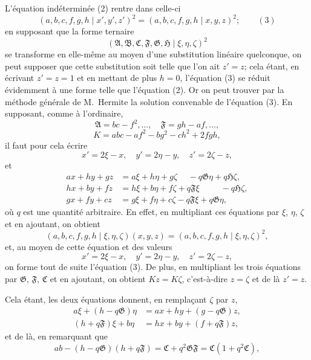 \documentclass[11pt]{article}
\begin{document}
\medskip
L'\'equation ind\'etermin\'ee (2) rentre dans celle-ci
\[
(a,b,c,f,g,h\mid x',y',z')^{2}=(a,b,c,f,g,h\mid x,y,z)^{2};\qquad(3)
\]
en supposant que la forme ternaire
\[
(\mathfrak{A},\mathfrak{B},\mathfrak{C},\mathfrak{F},\mathfrak{G},\mathfrak{H}\mid \xi,\eta,\zeta)^{2}
\]
se transforme en elle-m\^eme au moyen d'une substitution lin\'eaire quelconque, on peut supposer que cette substitution soit telle que l'on ait $z'=z$; cela \'etant, en \'ecrivant $z'=z=1$ et en mettant de plus $h=0$, l'\'equation (3) se r\'eduit \'evidemment \`a une forme telle que l'\'equation (2). Or on peut trouver par la m\'ethode g\'en\'erale de M.\ Hermite la solution convenable de l'\'equation (3). En supposant, comme \`a l'ordinaire,
\[
\mathfrak{A}=bc-f^{2},\ldots,\quad \mathfrak{F}=gh-af,\ldots,
\]
\[
K=abc-af^{2}-bg^{2}-ch^{2}+2fgh,
\]
il faut pour cela \'ecrire
\[
x'=2\xi-x,\quad y'=2\eta-y,\quad z'=2\zeta-z,
\]
et
\[
\begin{aligned}
ax+hy+gz &= a\xi+h\eta+g\zeta\phantom{+\eta} -q\mathfrak{G}\eta + q\mathfrak{H}\zeta,\\
hx+by+fz &= h\xi+b\eta+f\zeta + q\mathfrak{F}\xi\phantom{+\eta-} -q\mathfrak{H}\zeta,\\
gx+fy+cz &= g\xi+f\eta+c\zeta - q\mathfrak{F}\xi + q\mathfrak{G}\eta,
\end{aligned}
\]
o\`u $q$ est une quantit\'e arbitraire. En effet, en multipliant ces \'equations par $\xi$, $\eta$, $\zeta$ et en ajoutant, on obtient
\[
(a,b,c,f,g,h\mid \xi,\eta,\zeta)(x,y,z)=(a,b,c,f,g,h\mid \xi,\eta,\zeta)^{2},
\]
et, au moyen de cette \'equation et des valeurs
\[
x'=2\xi-x,\quad y'=2\eta-y,\quad z'=2\zeta-z,
\]
on forme tout de suite l'\'equation (3). De plus, en multipliant les trois \'equations par $\mathfrak{G}$, $\mathfrak{F}$, $\mathfrak{C}$ et en ajoutant, on obtient $Kz=K\zeta$, c'est-\`a-dire $z=\zeta$ et de l\`a $z'=z$.

\medskip
Cela \'etant, les deux \'equations donnent, en rempla\c{c}ant $\zeta$ par $z$,
\[
\begin{aligned}
a\xi + (h - q\mathfrak{G})\eta &= ax + hy + (g - q\mathfrak{G})z,\\
(h + q\mathfrak{F})\xi + b\eta &= hx + by + (f + q\mathfrak{F})z,
\end{aligned}
\]
et de l\`a, en remarquant que
\[
ab-(h-q\mathfrak{G})(h+q\mathfrak{F})=\mathfrak{C}+q^{2}\mathfrak{G}\mathfrak{F}=\mathfrak{C}(1+q^{2}\mathfrak{C}),
\]

\clearpage
\end{document}

